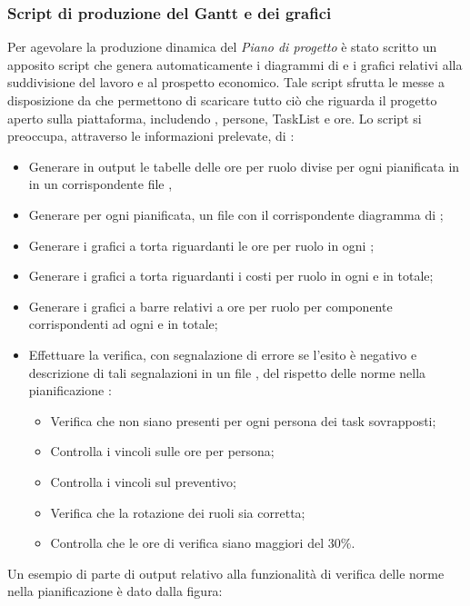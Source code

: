\subsubsection{Script di produzione del Gantt e dei grafici}
		\label{Gantt}
Per agevolare la produzione dinamica del \textit{Piano di progetto} è stato scritto un apposito script che genera automaticamente i diagrammi di  e i grafici relativi alla suddivisione del lavoro e al prospetto economico.
Tale script sfrutta le  messe a disposizione da  che permettono di scaricare tutto ciò che riguarda il progetto aperto sulla piattaforma, includendo , persone, TaskList e ore.
Lo script si preoccupa, attraverso le informazioni prelevate, di :
\begin{itemize}
\item Generare in output le tabelle delle ore per ruolo divise per ogni  pianificata in  in un corrispondente file ,
\item Generare per ogni  pianificata, un file  con il corrispondente diagramma di ;
\item Generare i grafici a torta riguardanti le ore per ruolo in ogni ;
\item Generare i grafici a torta riguardanti i costi per ruolo in ogni  e in totale;
\item Generare i grafici a barre relativi a ore per ruolo per componente corrispondenti ad ogni  e in totale;
\item Effettuare la verifica, con segnalazione di errore se l'esito è negativo e descrizione di tali segnalazioni in un file , del rispetto delle norme nella pianificazione : 
	\begin{itemize}
	\item Verifica che non siano presenti per ogni persona dei task sovrapposti;
	\item Controlla i vincoli sulle ore per persona;
	\item Controlla i vincoli sul preventivo;
	\item Verifica che la rotazione dei ruoli sia corretta;
	\item Controlla che le ore di verifica siano maggiori del 30$\%$.
	\end{itemize}
\end{itemize} 
Un esempio di parte di output relativo alla funzionalità di verifica delle norme nella pianificazione è dato dalla figura: 
